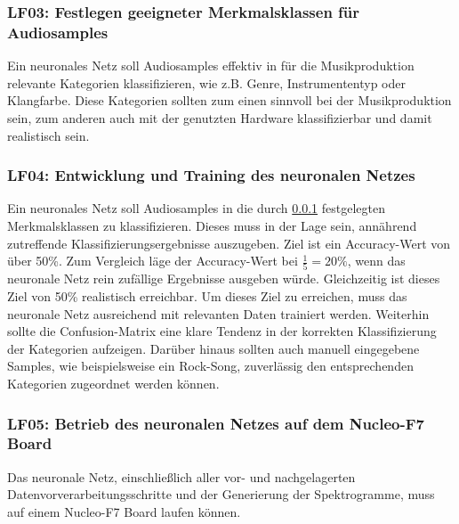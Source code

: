 \subsubsection{LF03: Festlegen geeigneter Merkmalsklassen für Audiosamples}
\label{sec:lf-nn-01}
Ein neuronales Netz soll Audiosamples effektiv in für die Musikproduktion relevante Kategorien klassifizieren, wie z.B. Genre, Instrumententyp oder Klangfarbe. Diese Kategorien sollten zum einen sinnvoll bei der Musikproduktion sein, zum anderen auch mit der genutzten Hardware klassifizierbar und damit realistisch sein.

\subsubsection{LF04: Entwicklung und Training des neuronalen Netzes}
\label{sec:lf-nn-02}
Ein neuronales Netz soll Audiosamples in die durch \ref{sec:lf-nn-01} festgelegten Merkmalsklassen zu klassifizieren. Dieses muss in der Lage sein, annährend zutreffende Klassifizierungsergebnisse auszugeben. Ziel ist ein Accuracy-Wert von über 50\%. Zum Vergleich läge der Accuracy-Wert bei \textit{$\frac{1}{5} = 20\%$}, wenn das neuronale Netz rein zufällige Ergebnisse ausgeben würde. Gleichzeitig ist dieses Ziel von 50\% realistisch erreichbar. Um dieses Ziel zu erreichen, muss das neuronale Netz ausreichend mit relevanten Daten trainiert werden.
Weiterhin sollte die Confusion-Matrix eine klare Tendenz in der korrekten Klassifizierung der Kategorien aufzeigen. Darüber hinaus sollten auch manuell eingegebene Samples, wie beispielsweise ein Rock-Song, zuverlässig den entsprechenden Kategorien zugeordnet werden können. 

\subsubsection{LF05: Betrieb des neuronalen Netzes auf dem Nucleo-F7 Board}
\label{sec:lf-nn-03}
Das neuronale Netz, einschließlich aller vor- und nachgelagerten Datenvorverarbeitungsschritte und der Generierung der Spektrogramme, muss auf einem Nucleo-F7 Board laufen können.